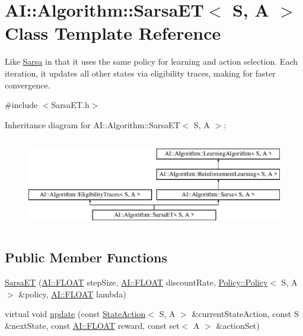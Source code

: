 \hypertarget{classAI_1_1Algorithm_1_1SarsaET}{\section{A\-I\-:\-:Algorithm\-:\-:Sarsa\-E\-T$<$ S, A $>$ Class Template Reference}
\label{classAI_1_1Algorithm_1_1SarsaET}
}


Like \hyperlink{classAI_1_1Algorithm_1_1Sarsa}{Sarsa} in that it uses the same policy for learning and action selection. Each iteration, it updates all other states via eligibility traces, making for faster convergence.  




{\ttfamily \#include $<$Sarsa\-E\-T.\-h$>$}

Inheritance diagram for A\-I\-:\-:Algorithm\-:\-:Sarsa\-E\-T$<$ S, A $>$\-:\begin{figure}[H]
\begin{center}
\leavevmode
\includegraphics[height=4.000000cm]{classAI_1_1Algorithm_1_1SarsaET}
\end{center}
\end{figure}
\subsection*{Public Member Functions}
\begin{DoxyCompactItemize}
\item 
\hyperlink{classAI_1_1Algorithm_1_1SarsaET_aa934143376cc47c6e42e3ec67fb93eae}{Sarsa\-E\-T} (\hyperlink{namespaceAI_a41b74884a20833db653dded3918e05c3}{A\-I\-::\-F\-L\-O\-A\-T} step\-Size, \hyperlink{namespaceAI_a41b74884a20833db653dded3918e05c3}{A\-I\-::\-F\-L\-O\-A\-T} discount\-Rate, \hyperlink{classAI_1_1Algorithm_1_1Policy_1_1Policy}{Policy\-::\-Policy}$<$ S, A $>$ \&policy, \hyperlink{namespaceAI_a41b74884a20833db653dded3918e05c3}{A\-I\-::\-F\-L\-O\-A\-T} lambda)
\item 
virtual void \hyperlink{classAI_1_1Algorithm_1_1SarsaET_adf13376b7ec8fdfa2b19ffadb1aa81e7}{update} (const \hyperlink{classAI_1_1StateAction}{State\-Action}$<$ S, A $>$ \&current\-State\-Action, const S \&next\-State, const \hyperlink{namespaceAI_a41b74884a20833db653dded3918e05c3}{A\-I\-::\-F\-L\-O\-A\-T} reward, const set$<$ A $>$ \&action\-Set)
\end{DoxyCompactItemize}
